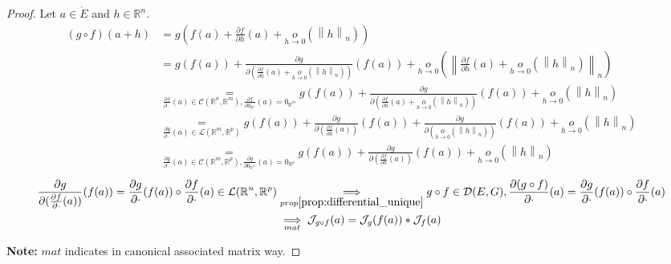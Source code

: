 \documentclass[11pt,en]{elegantpaper}
\newcommand{\norm}[1]{\left\lVert#1\right\rVert}
\newcommand{\Real}{\mathbb{R}}
\begin{document}
\begin{proof}
  Let $a \in \mathring{E}$ and $h \in \Real^n$.
  \begin{equation*}
    \begin{split}
      (g \circ f)(a+h) & = g(f(a) + \frac{\partial f}{\partial h}(a) + \underset{h \to 0}o(\norm h _n)) \\
      & = g(f(a)) + \frac{\partial g}{\partial (\frac{\partial f}{\partial h}(a) + \underset{h \to 0}o(\norm h _n))}(f(a))
        + \underset{h \to 0}o(\norm{\frac{\partial f}{\partial h}(a) + \underset{h \to 0}o(\norm h _n)}_n) \\
      & \underset{\frac{\partial f}{\partial \cdot}(a) \in \mathcal{C}(\Real^n,\Real^m),\frac{\partial f}{\partial 0_{\Real^n}}(a) = 0_{\Real^m}}
        = g(f(a)) + \frac{\partial g}{\partial (\frac{\partial f}{\partial h}(a) + \underset{h \to 0}o(\norm h _n))}(f(a)) + \underset{h \to 0}o(\norm h _n) \\
      & \underset{\frac{\partial g}{\partial \cdot}(a) \in \mathcal{L}(\Real^m,\Real^p)}
        = g(f(a)) + \frac{\partial g}{\partial (\frac{\partial f}{\partial h}(a))}(f(a)) + \frac{\partial g}{\partial (\underset{h \to 0}o(\norm h _n))}(f(a)) + \underset{h \to 0}o(\norm h _n) \\
      & \underset{\frac{\partial g}{\partial \cdot}(a) \in \mathcal{C}(\Real^m,\Real^p),\frac{\partial g}{\partial 0_{\Real^m}}(a) = 0_{\Real^p}}
        = g(f(a)) + \frac{\partial g}{\partial (\frac{\partial f}{\partial h}(a))}(f(a)) + \underset{h \to 0}o(\norm h _n)
    \end{split}
  \end{equation*}
  \begin{equation*}
    \begin{split}
      \frac{\partial g}{\partial (\frac{\partial f}{\partial \cdot}(a))}(f(a)) = \frac{\partial g}{\partial \cdot}(f(a)) \circ \frac{\partial f}{\partial \cdot}(a) \in \mathcal{L}(\Real^n, \Real^p)
      & \underset{prop\ref{prop:differential_unique}}\implies g \circ f \in \mathcal{D}(E,G), \frac{\partial (g \circ f)}{\partial \cdot}(a) = \frac{\partial g}{\partial \cdot}(f(a)) \circ \frac{\partial f}{\partial \cdot}(a) \\
      & \underset{mat}\implies \mathcal{J}_{g \circ f}(a) = \mathcal{J}_{g}(f(a)) * \mathcal{J}_{f}(a)
    \end{split}
  \end{equation*} \par

  \textbf{Note:} $mat$ indicates in canonical associated matrix way. \par
\end{proof}
\end{document}
